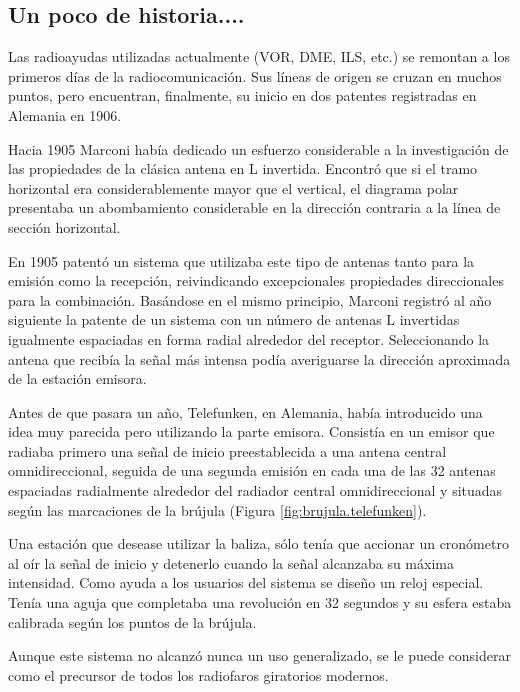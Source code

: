 


\subsection{Un poco de historia....}
\label{sec:06.VOR.historia}

 \begin{minipage}[c]{0.55\linewidth}

Las radioayudas utilizadas actualmente (VOR, DME, ILS, etc.) se remontan a los primeros d\'ias de la radiocomunicaci\'on. Sus l\'ineas de origen se cruzan en muchos puntos, pero  encuentran, finalmente, su inicio en dos patentes registradas en Alemania en 1906.

Hacia 1905 Marconi hab\'ia dedicado un esfuerzo considerable a la investigaci\'on de las propiedades de la cl\'asica antena en L invertida. Encontr\'o que si el tramo horizontal era considerablemente mayor que el vertical, el diagrama polar presentaba un abombamiento considerable en la direcci\'on contraria a la l\'inea de secci\'on horizontal.

En 1905 patent\'o un sistema que utilizaba este tipo de antenas tanto para la emisi\'on como la recepci\'on, reivindicando excepcionales propiedades direccionales para la combinaci\'on. Bas\'andose en el mismo principio, Marconi registr\'o al a\~no siguiente la patente de un sistema con un n\'umero de antenas L invertidas igualmente espaciadas en forma radial alrededor del receptor. Seleccionando la antena que recib\'ia la se\~nal m\'as intensa pod\'ia averiguarse la direcci\'on aproximada de la estaci\'on emisora.

Antes de que pasara un a\~no, Telefunken, en Alemania, hab\'ia introducido una idea muy parecida pero utilizando la parte emisora. Consist\'ia en un emisor que radiaba primero una se\~nal de inicio preestablecida a una antena central omnidireccional, seguida de una segunda emisi\'on en cada una de las 32 antenas espaciadas radialmente alrededor del radiador central omnidireccional y situadas seg\'un las marcaciones de la br\'ujula (Figura \ref{fig:brujula.telefunken}).

Una estaci\'on que desease utilizar la baliza, s\'olo ten\'ia que accionar un cron\'ometro al o\'ir la se\~nal de inicio y detenerlo cuando la se\~nal alcanzaba su m\'axima intensidad. Como ayuda a los usuarios del sistema se dise\~no un reloj especial. Ten\'ia una aguja que completaba una revoluci\'on en 32 segundos y su esfera estaba calibrada seg\'un los puntos de la br\'ujula.

Aunque este sistema no alcanz\'o nunca un uso generalizado, se le puede considerar como el precursor de todos los radiofaros giratorios modernos.


\end{minipage}

